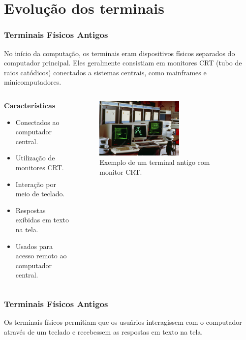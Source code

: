 \documentclass{beamer}
\begin{document}
\section{Evolução dos terminais}
\begin{frame}
	\frametitle{Terminais Físicos Antigos}

	No início da computação, os terminais eram dispositivos físicos separados do computador principal. Eles geralmente consistiam em monitores CRT (tubo de raios catódicos) conectados a sistemas centrais, como mainframes e minicomputadores.

	\begin{columns}
		\begin{column}{0.5\textwidth}
			\textbf{Características}
			\begin{itemize}
				\item Conectados ao computador central.
				\item Utilização de monitores CRT.
				\item Interação por meio de teclado.
				\item Respostas exibidas em texto na tela.
				\item Usados para acesso remoto ao computador central.
			\end{itemize}
		\end{column}

		\begin{column}{0.5\textwidth}
			\begin{figure}
				\centering
				\includegraphics[width=0.6\textwidth]{assets/aula-tads-pfds/terminal_antigo.jpg}
				\caption{Exemplo de um terminal antigo com monitor CRT.}
			\end{figure}
		\end{column}
	\end{columns}

\end{frame}
\begin{frame}\justifying
	\frametitle{Terminais Físicos Antigos}
	Os terminais físicos permitiam que os usuários interagissem com o computador através de um teclado e recebessem as respostas em texto na tela.

\end{frame}
\end{document}
